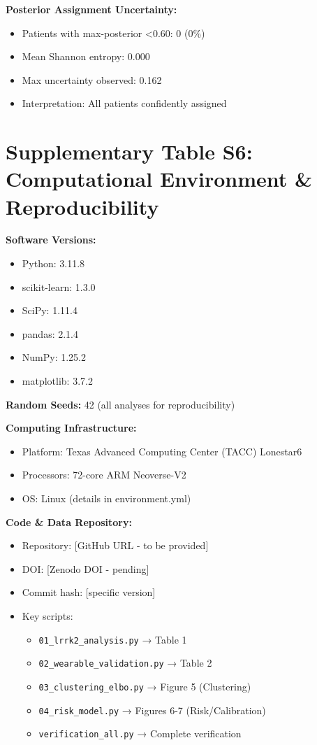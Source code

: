 \documentclass[11pt]{article}
\begin{document}
\textbf{Posterior Assignment Uncertainty:}
\begin{itemize}
\item Patients with max-posterior <0.60: 0 (0\%)
\item Mean Shannon entropy: 0.000
\item Max uncertainty observed: 0.162
\item Interpretation: All patients confidently assigned
\end{itemize}

\section*{Supplementary Table S6: Computational Environment \& Reproducibility}

\textbf{Software Versions:}
\begin{itemize}
\item Python: 3.11.8
\item scikit-learn: 1.3.0
\item SciPy: 1.11.4
\item pandas: 2.1.4
\item NumPy: 1.25.2
\item matplotlib: 3.7.2
\end{itemize}

\textbf{Random Seeds:} 42 (all analyses for reproducibility)

\textbf{Computing Infrastructure:}
\begin{itemize}
\item Platform: Texas Advanced Computing Center (TACC) Lonestar6
\item Processors: 72-core ARM Neoverse-V2
\item OS: Linux (details in environment.yml)
\end{itemize}

\textbf{Code \& Data Repository:}
\begin{itemize}
\item Repository: [GitHub URL - to be provided]
\item DOI: [Zenodo DOI - pending]
\item Commit hash: [specific version]
\item Key scripts:
  \begin{itemize}
  \item \texttt{01\_lrrk2\_analysis.py} → Table 1
  \item \texttt{02\_wearable\_validation.py} → Table 2
  \item \texttt{03\_clustering\_elbo.py} → Figure 5 (Clustering)
  \item \texttt{04\_risk\_model.py} → Figures 6-7 (Risk/Calibration)
  \item \texttt{verification\_all.py} → Complete verification
  \end{itemize}
\end{itemize}
\end{document}

